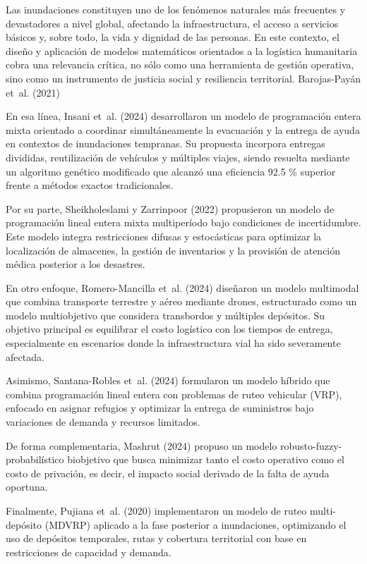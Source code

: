 \documentclass[
  spanish,
  us-letterpaper,
]{scrreprt}
\numberwithin{equation}{chapter} %
\begin{document}
Las inundaciones constituyen uno de los fenómenos naturales más
frecuentes y devastadores a nivel global, afectando la infraestructura,
el acceso a servicios básicos y, sobre todo, la vida y dignidad de las
personas. En este contexto, el diseño y aplicación de modelos
matemáticos orientados a la logística humanitaria cobra una relevancia
crítica, no sólo como una herramienta de gestión operativa, sino como un
instrumento de justicia social y resiliencia territorial. Barojas-Payán
et~al. (2021)

En esa línea, Insani et~al. (2024) desarrollaron un modelo de
programación entera mixta orientado a coordinar simultáneamente la
evacuación y la entrega de ayuda en contextos de inundaciones tempranas.
Su propuesta incorpora entregas divididas, reutilización de vehículos y
múltiples viajes, siendo resuelta mediante un algoritmo genético
modificado que alcanzó una eficiencia 92.5 \% superior frente a métodos
exactos tradicionales.

Por su parte, Sheikholeslami y Zarrinpoor (2022) propusieron un modelo
de programación lineal entera mixta multiperíodo bajo condiciones de
incertidumbre. Este modelo integra restricciones difusas y estocásticas
para optimizar la localización de almacenes, la gestión de inventarios y
la provisión de atención médica posterior a los desastres.

En otro enfoque, Romero-Mancilla et~al. (2024) diseñaron un modelo
multimodal que combina transporte terrestre y aéreo mediante drones,
estructurado como un modelo multiobjetivo que considera transbordos y
múltiples depósitos. Su objetivo principal es equilibrar el costo
logístico con los tiempos de entrega, especialmente en escenarios donde
la infraestructura vial ha sido severamente afectada.

Asimismo, Santana-Robles et~al. (2024) formularon un modelo híbrido que
combina programación lineal entera con problemas de ruteo vehicular
(VRP), enfocado en asignar refugios y optimizar la entrega de
suministros bajo variaciones de demanda y recursos limitados.

De forma complementaria, Mashrut (2024) propuso un modelo
robusto-fuzzy-probabilístico biobjetivo que busca minimizar tanto el
costo operativo como el costo de privación, es decir, el impacto social
derivado de la falta de ayuda oportuna.

Finalmente, Pujiana et~al. (2020) implementaron un modelo de ruteo
multi-depósito (MDVRP) aplicado a la fase posterior a inundaciones,
optimizando el uso de depósitos temporales, rutas y cobertura
territorial con base en restricciones de capacidad y demanda.
\end{document}

